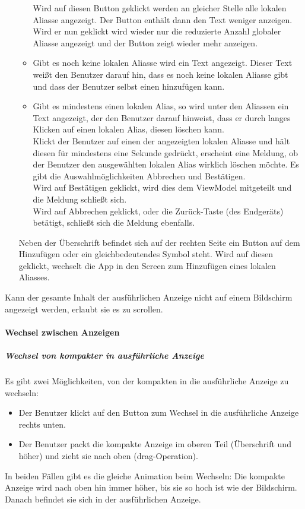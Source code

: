 \begin{itemize}
\begin{itemize}
        Wird auf diesen Button geklickt werden an gleicher Stelle alle lokalen Aliasse angezeigt. 
        Der Button enthält dann den Text \dq{}weniger anzeigen\dq{}. Wird er nun geklickt wird wieder nur die 
        reduzierte Anzahl globaler Aliasse angezeigt und der Button zeigt wieder \dq{}mehr anzeigen\dq{}.
        \item Gibt es noch keine lokalen Aliasse wird ein Text angezeigt. Dieser Text weißt den Benutzer 
        darauf hin, dass es noch keine lokalen Aliasse gibt und dass der Benutzer selbst einen hinzufügen kann.
        \item Gibt es mindestens einen lokalen Alias, so wird unter den Aliassen ein Text angezeigt, 
        der den Benutzer darauf hinweist, dass er durch langes Klicken auf einen lokalen Alias, diesen 
        löschen kann.\\
        Klickt der Benutzer auf einen der angezeigten lokalen Aliasse und hält diesen für mindestens eine 
        Sekunde gedrückt, erscheint eine Meldung, ob der Benutzer den ausgewählten lokalen Alias wirklich 
        löschen möchte. Es gibt die Auswahlmöglichkeiten \dq{}Abbrechen\dq{} und \dq{}Bestätigen\dq{}.\\ 
        Wird auf \dq{}Bestätigen\dq{} geklickt, wird dies dem ViewModel mitgeteilt und die Meldung schließt sich.\\
        Wird auf \dq{}Abbrechen\dq{} geklickt, oder die Zurück-Taste (des Endgeräts) betätigt, schließt sich die Meldung ebenfalls.
    \end{itemize}
    Neben der Überschrift befindet sich auf der rechten Seite ein Button auf dem \dq{}Hinzufügen\dq{} oder ein gleichbedeutendes Symbol steht. 
    Wird auf diesen geklickt, wechselt die App in den Screen zum Hinzufügen eines lokalen Aliasses.
\end{itemize}
Kann der gesamte Inhalt der ausführlichen Anzeige nicht auf einem Bildschirm angezeigt werden, erlaubt sie es zu scrollen.

\paragraph*{Wechsel zwischen Anzeigen}
\subparagraph*{Wechsel von kompakter in ausführliche Anzeige}
Es gibt zwei Möglichkeiten, von der kompakten in die ausführliche Anzeige zu wechseln:
\begin{itemize}
    \item Der Benutzer klickt auf den Button zum Wechsel in die ausführliche Anzeige rechts unten.
    \item Der Benutzer packt die kompakte Anzeige im oberen Teil (Überschrift und höher) und zieht sie nach oben (drag-Operation).
\end{itemize}
In beiden Fällen gibt es die gleiche Animation beim Wechseln: Die kompakte Anzeige wird nach oben hin immer 
höher, bis sie so hoch ist wie der Bildschirm. Danach befindet sie sich in der ausführlichen Anzeige.

